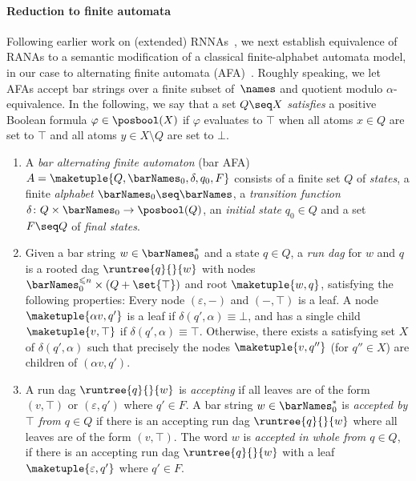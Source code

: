 \documentclass[10pt, final, conference, a4paper, twocolumn]{IEEEtran}
\begin{document}
\paragraph*{Reduction to finite automata} Following earlier work on
(extended) RNNAs~\cite{skmw17,hms21}, we next establish equivalence of
RANAs to a semantic modification of a classical finite-alphabet
automata model, in our case to alternating finite automata
(AFA)~\cite{cks81}. Roughly speaking, we let AFAs accept bar strings
over a finite subset of~$\names$ and quotient modulo
$\alpha$-equivalence. In the following, we say that a set $Q \seq X$ \emph{satisfies} a positive Boolean formula
$\varphi \in \posbool(X)$ if $\varphi$ evaluates to $\top$ when all
atoms $x \in Q$ are set to $\top$ and all atoms $y \in X \setminus Q$ are
set to $\bot$.

\begin{defn}\label{defn:bafa}
  \begin{enumerate}
  \item A \emph{bar alternating finite automaton} (bar AFA) $A = \maketuple{Q, \barNames_0, \delta, q_0, F}$ consists of a finite set $Q$ of \emph{states}, a finite \emph{alphabet} $\barNames_0 \seq \barNames$, a \emph{transition function} $\delta\colon Q \times \barNames_0 \to \posbool(Q)$, an \emph{initial state} $q_0 \in Q$ and a set $F \seq Q$ of \emph{final states}.

  \item Given a bar string $w \in \barNames_0^*$ and a state $q \in Q$, a \emph{run dag} for $w$ and $q$ is a rooted dag $\runtree{q}{}{w}$ with nodes $\barNames_0^{\leqslant n} \times (Q + \set{\top})$ and root $\maketuple{w, q}$, satisfying the following properties: Every node $(\varepsilon,-)$ and $(-,\top)$ is a leaf. A node $\maketuple{\alpha v, q'}$ is a leaf if
    $\delta(q', \alpha) \equiv \bot$, and has a single child $\maketuple{v, \top}$ if \mbox{$\delta(q',\alpha)\equiv \top$}. Otherwise, there exists a satisfying
    set $X$ of $\delta(q', \alpha)$ such that precisely the nodes $\maketuple{v, q''}$ (for $q'' \in X$)
    are children of $(\alpha v,q')$.
    
  \item A run dag $\runtree{q}{}{w}$ is \emph{accepting} if all leaves are of the form $(v,\top)$ or $(\varepsilon,q')$ where $q'\in F$. A bar string $w \in \barNames_0^*$ is
    \emph{accepted by $\top$ from $q \in Q$} if there is an accepting run dag $\runtree{q}{}{w}$
    where all leaves are of the form $(v,\top)$. The word $w$ is \emph{accepted in whole from $q \in Q$}, if
    there is an accepting run dag $\runtree{q}{}{w}$ with a leaf $\maketuple{\varepsilon, q'}$ where
    $q' \in F$. %


\end{enumerate}
\end{defn}
\end{document}
